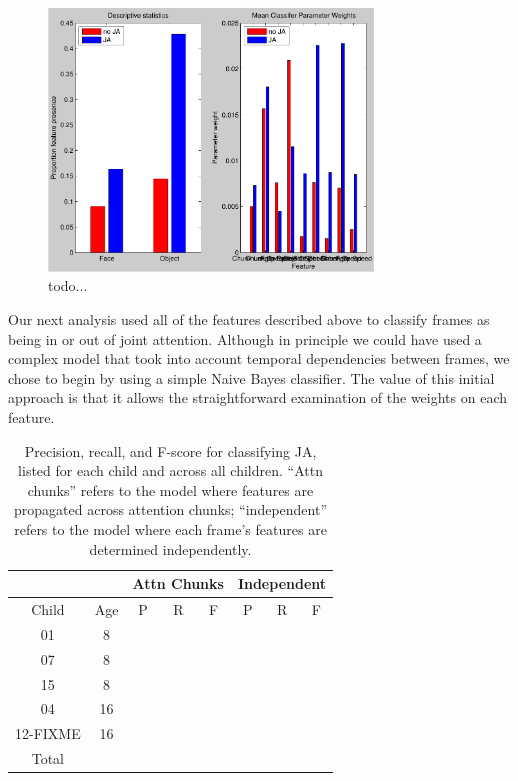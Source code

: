 \documentclass[10pt,letterpaper]{article}
\begin{document}
\begin{figure}[t]
     \begin{center}
           \includegraphics[width=3.4in]{Image/individual.pdf} 
          \end{center}
    \caption{todo... }
   \label{fig:main}
\end{figure}

Our next analysis used all of the features described above to classify frames as being in or out of joint attention. Although in principle we could have used a complex model that took into account temporal dependencies between frames, we chose to begin by using a simple Naive Bayes classifier. The value of this initial approach is that it allows the straightforward examination of the weights on each feature. 

\begin{table}[t]
\centering
\begin{tabular}{cc|ccc|ccc}
 & &\multicolumn{3}{c}{Attn Chunks} & \multicolumn{3}{c}{Independent} \\
\hline
Child & Age & P & R & F & P & R & F \\
\hline
01 &  8  & & & & & & \\
07 &  8 & & & & & &\\
15 &   8 & & & & & &\\
04 &  16 & & & & & &\\
12-FIXME& 16 & & & & &\\
\hline
Total & & & & & & &\\
\hline
\end{tabular}
\caption{Precision, recall, and F-score for classifying JA, listed for each child and across all children. ``Attn chunks'' refers to the model where features are propagated across attention chunks; ``independent'' refers to the model where each frame's features are determined independently.}
\label{tb:Results2}
\end{table}
\end{document}
